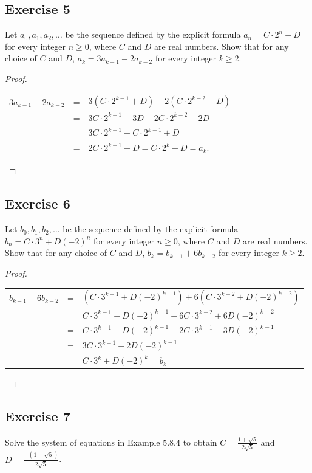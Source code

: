 \documentclass[14pt]{extarticle}
\newcommand{\dps}{\displaystyle}
\begin{document}
\subsection{Exercise 5}
Let \(a_0, a_1, a_2, \ldots\) be the sequence defined by the explicit formula \(a_n = C \cdot 2^n + D\) for every 
integer \(n \geq 0\), where $C$ and $D$ are real numbers. 
Show that for any choice of $C$ and $D$, \(a_k = 3a_{k-1} - 2a_{k-2}\) for every integer \(k \geq 2\).

\begin{proof}
\begin{tabular}{rcl}
\(3a_{k-1} - 2a_{k-2}\) & = & \(3(C \cdot 2^{k-1} + D) - 2(C \cdot 2^{k-2} + D)\) \\
& = & \(3C \cdot 2^{k-1} + 3D - 2C \cdot 2^{k-2} -2D\) \\
& = & \(3C \cdot 2^{k-1} - C \cdot 2^{k-1} + D\) \\
& = & \(2C \cdot 2^{k-1} + D = C \cdot 2^k + D = a_k\).
\end{tabular}
\end{proof}

\subsection{Exercise 6}
Let \(b_0, b_1, b_2, \ldots\) be the sequence defined by the explicit formula \(b_n = C \cdot 3^n + D(-2)^n\) for 
every integer \(n \geq 0\), where $C$ and $D$ are real numbers. Show that for any choice of $C$ and $D$, 
\(b_k = b_{k-1} + 6b_{k-2}\) for every integer \(k \geq 2\).

\begin{proof}
\begin{tabular}{rcl}
\(b_{k-1} + 6b_{k-2}\) & = & \((C \cdot 3^{k-1} + D(-2)^{k-1}) + 6(C \cdot 3^{k-2} + D(-2)^{k-2})\) \\
& = & \(C \cdot 3^{k-1} + D(-2)^{k-1} + 6C \cdot 3^{k-2} + 6D(-2)^{k-2}\) \\
& = & \(C \cdot 3^{k-1} + D(-2)^{k-1} + 2C \cdot 3^{k-1} - 3D(-2)^{k-1}\) \\
& = & \(3C \cdot 3^{k-1} - 2D(-2)^{k-1}\) \\
& = & \(C \cdot 3^k + D(-2)^k = b_k\)
\end{tabular}
\end{proof}

\subsection{Exercise 7}
Solve the system of equations in Example 5.8.4 to obtain \(\dps C = \frac{1 + \sqrt{5}}{2 \sqrt{5}}\) 
and \(\dps D = \frac{-(1 - \sqrt{5})}{2 \sqrt{5}}\).
\end{document}
